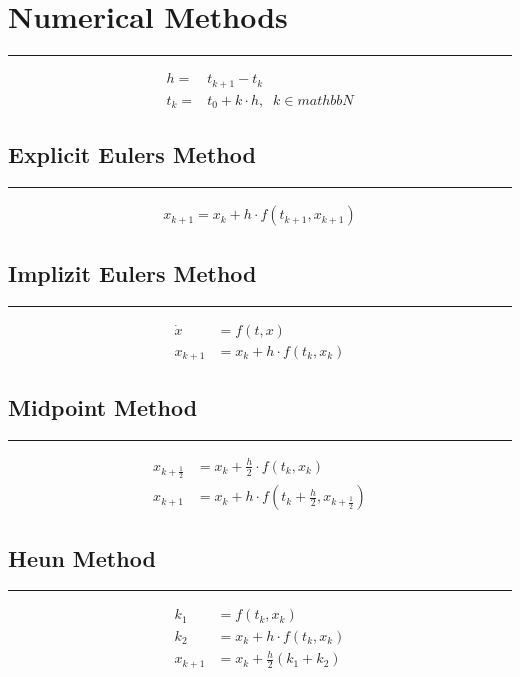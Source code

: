 \section{Numerical Methods}
\noindent\rule[\linienAbstand]{\linewidth}{\linienDickeDick}
\begin{equation}
  \begin{split}
    h =& t_{k+1} - t_k\\
    t_k =& t_0 + k \cdot h, \;\; k \in mathbb{N}
  \end{split}
\end{equation}

\subsection{Explicit Eulers Method}
\noindent\rule[\linienAbstand]{\linewidth}{\linienDicke}
\begin{equation}
  \begin{split}
    x_{k+1} = x_k + h \cdot f(t_{k+1}, x_{k+1})
  \end{split}
\end{equation}

\subsection{Implizit Eulers Method}
\noindent\rule[\linienAbstand]{\linewidth}{\linienDicke}
\begin{equation}
  \begin{split}
    \dot{x} &= f(t, x)\\
    x_{k+1} &= x_k + h \cdot f(t_k, x_k)
  \end{split}
\end{equation}

\subsection{Midpoint Method}
\noindent\rule[\linienAbstand]{\linewidth}{\linienDicke}
\begin{equation}
  \begin{split}
    x_{k+\frac{1}{2}} &= x_k + \frac{h}{2} \cdot f(t_k, x_k)\\
    x_{k+1}           &= x_k + h \cdot f(t_{k} + \frac{h}{2}, x_{k+\frac{1}{2}})
  \end{split}
\end{equation}

\subsection{Heun Method}
\noindent\rule[\linienAbstand]{\linewidth}{\linienDicke}
\begin{equation}
  \begin{split}
    k_1 &= f(t_k, x_k)\\
    k_2 &= x_k + h \cdot f(t_k, x_k)\\
    x_{k+1} &= x_k + \frac{h}{2}(k_1 + k_2)
  \end{split}
\end{equation}

